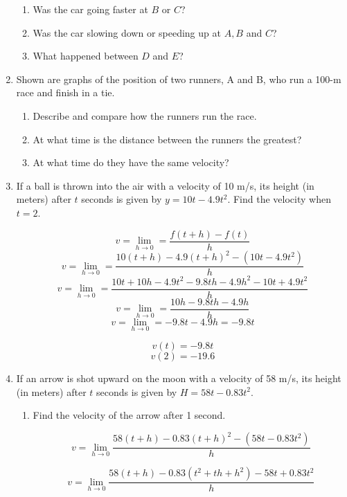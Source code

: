 \documentclass{article}
\begin{document}
\begin{enumerate}
\begin{enumerate}
			\item Was the car going faster at $B$ or $C$?

			\item Was the car slowing down or speeding up at $A,B$ and $C$?

			\item What happened between $D$ and $E$?
		\end{enumerate}
		\item Shown are graphs of the position of two runners, A and B, who run a
			100-m race and finish in a tie.

		\begin{enumerate}
			\item Describe and compare how the runners run the race.

			\item At what time is the distance between the runners the greatest?

			\item At what time do they have the same velocity?
		\end{enumerate}

		\item If a ball is thrown into the air with a velocity of 10 m/s, its height
			(in meters) after $t$ seconds is given by $y = 10t - 4.9t^2$. Find the
			velocity when $t = 2$.

			$$v = \lim \limits _{h \to 0} = \frac{f(t+h) - f(t)}{h}$$
			$$v = \lim \limits _{h \to 0} = \frac{10(t+h) - 4.9(t+h)^2 - (10t - 4.9t^2)}{h}$$
			$$v = \lim \limits _{h \to 0} = \frac{10t + 10h - 4.9t^2 - 9.8th - 4.9h^2 - 10t + 4.9t^2}{h}$$
			$$v = \lim \limits _{h \to 0} = \frac{10h - 9.8th - 4.9h}{h}$$
			$$v = \lim \limits _{h \to 0} = -9.8t - 4.9 h = -9.8t$$

			$$v(t) = -9.8t$$
			$$v(2) = -19.6$$

		\item If an arrow is shot upward on the moon with a velocity of 58 m/s, its height (in meters)
			after $t$ seconds is given by $H = 58t - 0.83t^2$.

		\begin{enumerate}
			\item Find the velocity of the arrow after 1 second.

				$$v = \lim \limits _{h \to 0} \frac{58(t + h) - 0.83(t+h)^2 - (58t - 0.83t^2)}{h}$$

				$$v = \lim \limits _{h \to 0} \frac{58(t+h) - 0.83(t^2+th+h^2)-58t+0.83t^2}{h}$$


\end{enumerate}
\end{enumerate}
\end{document}

